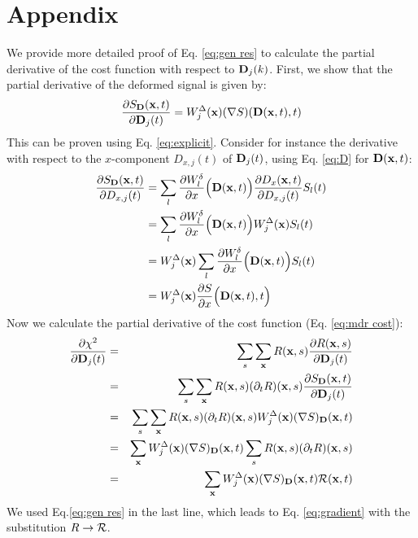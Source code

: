\documentclass[num-refs]{wiley-article}
\newcommand{\x}{{\bf x}}
\newcommand{\D}{{\bf D}}
\begin{document}
\section{Appendix}
We provide more detailed proof of Eq. \ref{eq:gen res} to calculate the partial derivative of the cost function with respect to $\D_j(k)$. First, we show that the partial derivative of the deformed signal is given by: 
\begin{equation}
\label{eq:grad}
\frac {\partial S_\D(\x, t)}{\partial \D_j(t) }=W^{\Delta}_j(\x) (\nabla S)(\D (\x,t), t)
\end{equation}
This can be proven using Eq. \ref{eq:explicit}. Consider for instance the derivative with respect to the $x$-component $D_{x,j}(t)$ of $\D_j(t)$, using Eq. \ref{eq:D} for $\D(\x, t)$:
\begin{equation*}
\begin{split}
\frac{\partial S_{\bf D}(\x, t)}{\partial D_{x,j}(t)} 
& =\sum_l  \frac{\partial W_l^{\delta}}{\partial x}\Big( \D (\x, t)\Big)  \frac{\partial D_x(\x, t)}{\partial D_{x,j}(t)} S_l(t) \\
&= \sum_l \frac{\partial W_l^{\delta}}{\partial x}\Big( \D (\x, t)\Big) W_j^{\Delta}(\x) S_l(t)\\
& =  W_j^{\Delta}(\x) \sum_l  \frac{\partial W_l^{\delta}}{\partial x}\Big( \D (\x, t)\Big) S_l(t)\\
& =  W_j^{\Delta}(\x) \frac{\partial S}{\partial x}\Big(\D (\x, t),t\Big)
\end{split}
\end{equation*}
Now we calculate the partial derivative of the cost function (Eq. \ref{eq:mdr cost}): 
\begin{eqnarray*} 
	\frac{\partial \chi^2}{\partial \D_j(t)} 
	&=& \sum_s\sum_\x R(\x, s)\frac{\partial R(\x,s)}{\partial \D_j(t)}  \\
	&=& \sum_s\sum_\x R(\x, s) (\partial_t R)(\x,s) \frac{\partial S_{\bf D}(\x, t)}{\partial \D_j(t)} \\
	&=& \sum_s\sum_\x R(\x, s) (\partial_t R)(\x,s) W_j^{\Delta}(\x) (\nabla S)_\D(\x,t) \\
	&=& \sum_\x W_j^{\Delta}(\x) (\nabla S)_\D(\x,t) \sum_s R(\x, s) (\partial_t R)(\x, s)  \\
	&=& \sum_\x W_j^{\Delta}(\x) (\nabla S)_\D(\x,t) {\cal R}(\x, t) \\
\end{eqnarray*}
We used Eq.\ref{eq:gen res} in the last line, which leads to Eq. \ref{eq:gradient} with the substitution $R\to {\cal R}$.
\end{document}
